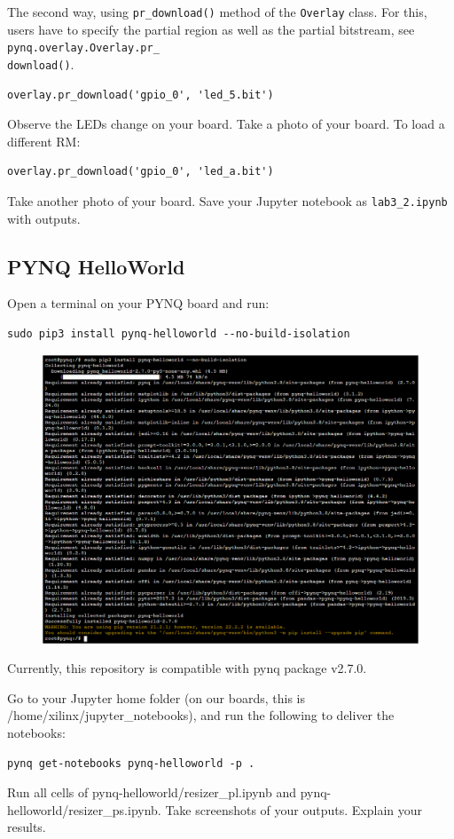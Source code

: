 \documentclass[a4paper,12pt,twoside]{article}
\begin{document}
The second way, using \texttt{pr\_download()} method of the \texttt{Overlay} class. For this, users have to specify the partial region as well as the partial bitstream, see \texttt{pynq.overlay.Overlay.pr\_\\
download()}.
\begin{verbatim}
overlay.pr_download('gpio_0', 'led_5.bit')
\end{verbatim}
Observe the LEDs change on your board. Take a photo of your board. To load a different RM:
\begin{verbatim}
overlay.pr_download('gpio_0', 'led_a.bit')
\end{verbatim}
Take another photo of your board. Save your Jupyter notebook as \texttt{lab3\_2.ipynb} with outputs.
\subsection{PYNQ HelloWorld}\label{S53}
Open a terminal on your PYNQ board and run:
\begin{verbatim}
sudo pip3 install pynq-helloworld --no-build-isolation
\end{verbatim}
\begin{figure}[H]
    \centering
    \includegraphics[width=\textwidth]{images/27.png}
\end{figure}
Currently, this repository is compatible with pynq package v2.7.0.

Go to your Jupyter home folder (on our boards, this is /home/xilinx/jupyter\_notebooks), and run the following to deliver the notebooks:
\begin{verbatim}
pynq get-notebooks pynq-helloworld -p .
\end{verbatim}
Run all cells of pynq-helloworld/resizer\_pl.ipynb and pynq-helloworld/resizer\_ps.ipynb. Take screenshots of your outputs. Explain your results.
\end{document}

